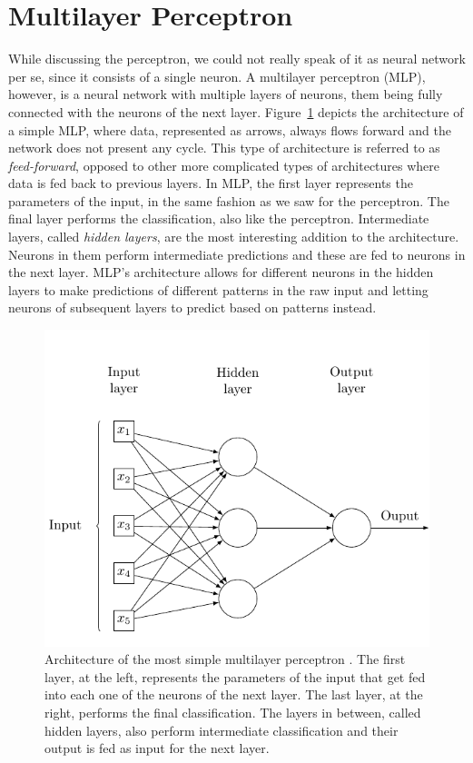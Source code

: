 
\section{Multilayer Perceptron}
\label{sec:theory:mlp}

While discussing the perceptron, we could not really speak of it as neural network per se, since it consists of a single neuron.
A multilayer perceptron (MLP), however, is a neural network with multiple layers of neurons, them being fully connected with the neurons of the next layer.
Figure~\ref{fig:sec:theory:mlp} depicts the architecture of a simple MLP, where data, represented as arrows, always flows forward and the network does not present any cycle.
This type of architecture is referred to as \emph{feed-forward}, opposed to other more complicated types of architectures where data is fed back to previous layers.
In MLP, the first layer represents the parameters of the input, in the same fashion as we saw for the perceptron.
The final layer performs the classification, also like the perceptron.
Intermediate layers, called \emph{hidden layers}, are the most interesting addition to the architecture.
Neurons in them perform intermediate predictions and these are fed to neurons in the next layer.
MLP's architecture allows for different neurons in the hidden layers to make predictions of different patterns in the raw input and letting neurons of subsequent layers to predict based on patterns instead.

\begin{figure}[htb]
  \includegraphics[width=\textwidth]{tkz/mlp}
  \caption{Architecture of the most simple multilayer perceptron \cite{Medina2013A}.
  The first layer, at the left, represents the parameters of the input that get fed into each one of the neurons of the next layer.
  The last layer, at the right, performs the final classification.
  The layers in between, called hidden layers, also perform intermediate classification and their output is fed as input for the next layer.}
  \label{fig:sec:theory:mlp}
\end{figure}

